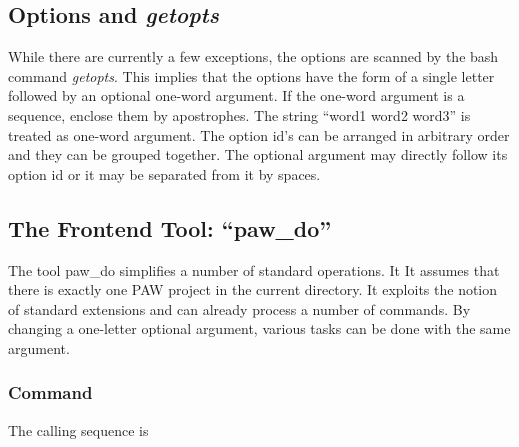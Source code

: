 \documentclass[final,12pt,makeidx,DIV=calc]{article}
\begin{document}
{{{{{{%
\subsection{Options and \textit{getopts}}
While there are currently a few exceptions, the options are scanned by
the bash command \textit{getopts}. This implies that the options have
the form of a single letter followed by an optional one-word
argument. If the one-word argument is a sequence, enclose them by
apostrophes. The string ``word1 word2 word3'' is treated as one-word
argument.  The option id's can be arranged in arbitrary order and they
can be grouped together. The optional argument may directly follow its
option id or it may be separated from it by spaces.

\subsection{The Frontend Tool: ``paw\_do''}
\label{sec:pawdo}
The tool paw\_do simplifies a number of standard operations.  It It
assumes that there is exactly one PAW project in the current
directory.  It exploits the notion of standard extensions and can
already process a number of commands. By changing a one-letter
optional argument, various tasks can be done with the same argument.


\subsubsection{Command}

The calling sequence is

\bigskip{}\bigskip

}}}}}}
\end{document}
